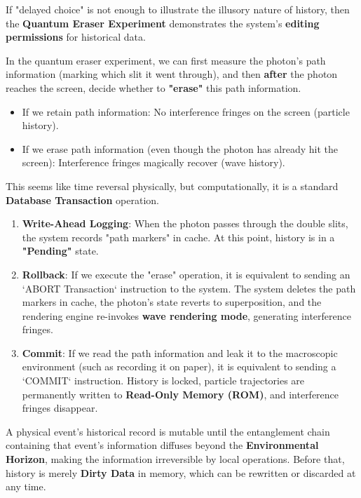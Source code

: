 If "delayed choice" is not enough to illustrate the illusory nature of history, then the \textbf{Quantum Eraser Experiment} demonstrates the system's \textbf{editing permissions} for historical data.

In the quantum eraser experiment, we can first measure the photon's path information (marking which slit it went through), and then \textbf{after} the photon reaches the screen, decide whether to \textbf{"erase"} this path information.

\begin{itemize}
\item If we retain path information: No interference fringes on the screen (particle history).

\item If we erase path information (even though the photon has already hit the screen): Interference fringes magically recover (wave history).
\end{itemize}

This seems like time reversal physically, but computationally, it is a standard \textbf{Database Transaction} operation.

\begin{enumerate}
\item \textbf{Write-Ahead Logging}: When the photon passes through the double slits, the system records "path markers" in cache. At this point, history is in a \textbf{"Pending"} state.

\item \textbf{Rollback}: If we execute the "erase" operation, it is equivalent to sending an `ABORT Transaction` instruction to the system. The system deletes the path markers in cache, the photon's state reverts to superposition, and the rendering engine re-invokes \textbf{wave rendering mode}, generating interference fringes.

\item \textbf{Commit}: If we read the path information and leak it to the macroscopic environment (such as recording it on paper), it is equivalent to sending a `COMMIT` instruction. History is locked, particle trajectories are permanently written to \textbf{Read-Only Memory (ROM)}, and interference fringes disappear.
\end{enumerate}

\begin{theorem}
A physical event's historical record is mutable until the entanglement chain containing that event's information diffuses beyond the \textbf{Environmental Horizon}, making the information irreversible by local operations. Before that, history is merely \textbf{Dirty Data} in memory, which can be rewritten or discarded at any time.
\end{theorem}

